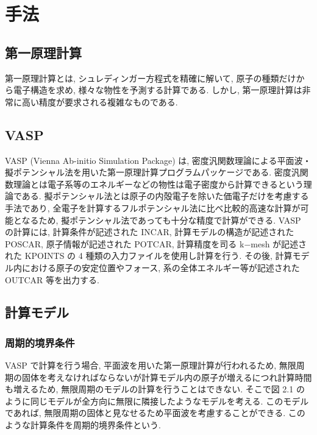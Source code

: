 \chapter{手法}


\section{第一原理計算}
第一原理計算とは, シュレディンガー方程式を精確に解いて, 原子の種類だけから電子構造を求め, 様々な物性を予測する計算である. しかし, 第一原理計算は非常に高い精度が要求される複雑なものである.


\section{VASP}
VASP (Vienna Ab-initio Simulation Package) は, 密度汎関数理論による平面波・擬ポテンシャル法を用いた第一原理計算プログラムパッケージである. 密度汎関数理論とは電子系等のエネルギーなどの物性は電子密度から計算できるという理論である. 擬ポテンシャル法とは原子の内殻電子を除いた価電子だけを考慮する手法であり, 全電子を計算するフルポテンシャル法に比べ比較的高速な計算が可能となるため, 擬ポテンシャル法であっても十分な精度で計算ができる.
VASP の計算には, 計算条件が記述された INCAR, 計算モデルの構造が記述された POSCAR, 原子情報が記述された POTCAR, 計算精度を司る k−mesh が記述された KPOINTS の 4 種類の入力ファイルを使用し計算を行う. その後, 計算モデル内における原子の安定位置やフォース, 系の全体エネルギー等が記述された OUTCAR 等を出力する.


\section{計算モデル}
\subsection{周期的境界条件}
VASP で計算を行う場合, 平面波を用いた第一原理計算が行われるため, 無限周期の固体を考えなければならないが計算モデル内の原子が増えるにつれ計算時間も増えるため, 無限周期のモデルの計算を行うことはできない. そこで図 2.1 のように同じモデルが全方向に無限に隣接したようなモデルを考える. このモデルであれば, 無限周期の固体と見なせるため平面波を考慮することができる. このような計算条件を周期的境界条件という.

